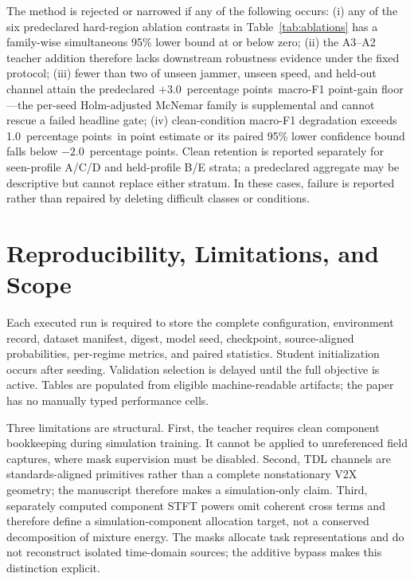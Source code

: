 \documentclass[letterpaper,journal]{IEEEtran}
\newcommand{\pp}{percentage points}
\begin{document}
The method is rejected or narrowed if any of the following occurs: (i) any
of the six predeclared hard-region ablation contrasts in
Table~\ref{tab:ablations} has a family-wise simultaneous 95\% lower bound at
or below zero; (ii) the A3--A2 teacher addition therefore lacks downstream
robustness evidence under the fixed protocol; (iii) fewer than two of unseen
jammer, unseen speed, and held-out channel attain the predeclared
$+3.0$~\pp\ macro-F1 point-gain floor---the per-seed Holm-adjusted McNemar
family is supplemental and cannot rescue a failed headline gate; (iv)
clean-condition macro-F1 degradation exceeds 1.0~\pp\ in
point estimate or its paired 95\% lower confidence bound falls below
$-2.0$~\pp.  Clean retention is reported separately for seen-profile A/C/D
and held-profile B/E strata; a predeclared aggregate may be descriptive but
cannot replace either stratum.  In these cases, failure is
reported rather than repaired by deleting difficult classes or conditions.

\section{Reproducibility, Limitations, and Scope}
Each executed run is required to store the complete configuration, environment
record, dataset
manifest, digest, model seed, checkpoint, source-aligned probabilities,
per-regime metrics, and paired statistics.  Student initialization occurs
after seeding.  Validation selection is delayed until the full objective is
active.  Tables are populated from eligible machine-readable artifacts; the
paper has no manually typed performance cells.

Three limitations are structural.  First, the teacher requires clean component
bookkeeping during simulation training. It cannot be applied to unreferenced
field captures, where mask supervision must be disabled. Second, TDL channels
are standards-aligned primitives rather than a complete nonstationary V2X
geometry; the manuscript therefore makes a simulation-only claim. Third,
separately computed component STFT powers omit
coherent cross terms and therefore define a simulation-component allocation
target, not a conserved decomposition of mixture energy.  The masks allocate
task representations and do not reconstruct isolated time-domain sources; the
additive bypass makes this distinction explicit.
\end{document}
